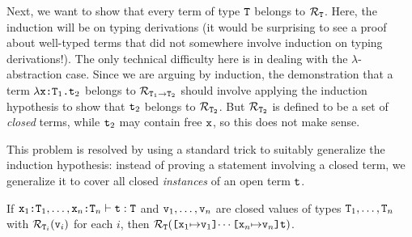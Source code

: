 \documentclass[11pt,twoside=off,numbers=noenddot]{scrbook}
\begin{document}
Next, we want to show that every term of type $\texttt{T}$ belongs to
$\mathcal{R}_{\texttt{T}}$. Here, the induction will be on typing
derivations (it would be surprising to see a proof about well-typed
  terms that did not somewhere involve induction on typing
derivations!). The only technical difficulty here is in dealing with
the $\lambda$-abstraction case. Since we are arguing by induction,
the demonstration that a term
$\texttt{$\lambda$x:$\texttt{T}_1$.$\texttt{t}_2$}$ belongs to
$\mathcal{R}_{\texttt{$\texttt{T}_1$$\rightarrow$$\texttt{T}_2$}}$ should
involve applying the induction hypothesis to show that $\texttt{t}_2$
belongs to $\mathcal{R}_{\texttt{T}_2}$. But $\mathcal{R}_{\texttt{T}_2}$
is defined to be a set of \textit{closed} terms, while $\texttt{t}_2$
may contain free $\texttt{x}$, so this does not make sense.

This problem is resolved by using a standard trick to suitably
generalize the induction hypothesis: instead of proving a statement
involving a closed term, we generalize it to cover all closed
\textit{instances} of an open term $\texttt{t}$.

\begin{lemma}
  If $\texttt{$\texttt{x}_1$:$\texttt{T}_1$}, \dots, \texttt{$\texttt{x}_n$:$\texttt{T}_n$} \vdash
  \texttt{t} : \texttt{T}$ and $\texttt{v}_1, \dots, \texttt{v}_n$ are closed
  values of types $\texttt{T}_1, \dots, \texttt{T}_n$ with
  $\mathcal{R}_{\texttt{T}_i}(\texttt{v}_i)$ for each $i$, then
  $\mathcal{R}_{\texttt{T}}(\texttt{[$\texttt{x}_1$$\mapsto$$\texttt{v}_1$]$\cdots$[$\texttt{x}_n$$\mapsto$$\texttt{v}_n$]t})$.
\end{lemma}
\end{document}
